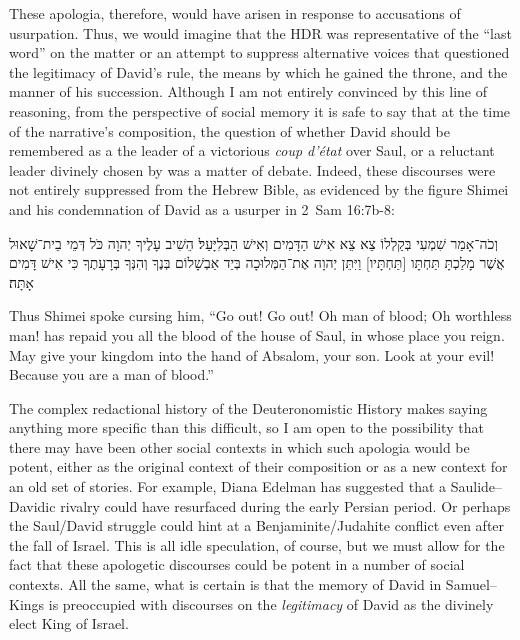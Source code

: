 These apologia, therefore, would have arisen in response to accusations of usurpation. Thus, we would imagine that the HDR was representative of the ``last word'' on the matter or an attempt to suppress alternative voices that questioned the legitimacy of David's rule, the means by which he gained the throne, and the manner of his succession. Although I am not entirely convinced by this line of reasoning, from the perspective of social memory it is safe to say that at the time of the narrative's composition, the question of whether David should be remembered as a the leader of a victorious \emph{coup d'état} over Saul, or a reluctant leader divinely chosen by \yahweh was a matter of debate. Indeed, these discourses were not entirely suppressed from the Hebrew Bible, as evidenced by the figure Shimei and his condemnation of David as a usurper in 2~Sam 16:7b-8:
\begin{hebrewtext}
    וְכֹה־אָמַר שִׁמְעִי בְּקַלְלוֹ צֵא צֵא אִישׁ הַדָּמִים וְאִישׁ הַבְּלִיָּעַל׃ 
    הֵשִׁיב עָלֶיךָ יְהוָה כֹּל דְּמֵי בֵית־שָׁאוּל אֲשֶׁר מָלַכְתָּ תַּחְתָּו [תַּחְתָּיו] וַיִּתֵּן יְהוָה אֶת־הַמְּלוּכָה בְּיַד אַבְשָׁלוֹם בְּנֶךָ וְהִנְּךָ בְּרָעָתֶךָ כִּי אִישׁ דָּמִים אָתָּה׃
\end{hebrewtext}
\begin{translation}
    Thus Shimei spoke cursing him, ``Go out! Go out! Oh man of blood; Oh worthless man! \yahweh has repaid you all the blood of the house of Saul, in whose place you reign. May \yahweh give your kingdom into the hand of Absalom, your son. Look at your evil! Because you are a man of blood.''
\end{translation}
\noindent
The complex redactional history of the Deuteronomistic History makes saying anything more specific than this difficult, so I am open to the possibility that there may have been other social contexts in which such apologia would be potent, either as the original context of their composition or as a new context for an old set of stories. For example, Diana Edelman has suggested that a Saulide--Davidic rivalry could have resurfaced during the early Persian period.%
    \autocite{edelman_dearman-graham2002}
Or perhaps the Saul/David struggle could hint at a Benjaminite/Judahite conflict even after the fall of Israel. This is all idle speculation, of course, but we must allow for the fact that these apologetic discourses could be potent in a number of social contexts. All the same, what is certain is that the memory of David in Samuel--Kings is preoccupied with discourses on the \emph{legitimacy} of David as the divinely elect King of Israel. 

